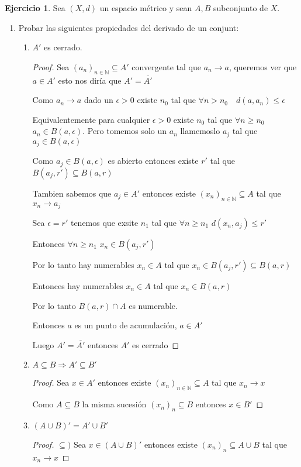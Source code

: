 \documentclass[12pt]{article}
\newcommand{\N}{\mathbb{N}}
\newcommand{\ra}{\rightarrow}
\newcommand{\ol}{\overline}
\theoremstyle{definition}
\newtheorem{ej}{Ejercicio}
\begin{document}
\begin{ej}
  Sea $(X,d)$ un espacio métrico y sean $A,B$ subconjunto de $X$.
  \begin{enumerate}
    \item Probar las siguientes propiedades del derivado de un conjunt:
      \begin{enumerate}
	\item $A'$ es cerrado.
	  \begin{proof}
	    Sea $(a_{n})_{n \in \N} \subseteq A'$ convergente tal que $a_{n} \ra a$, queremos ver que $a \in A'$ esto nos diría que $A' = \ol{A'}$

	    Como $a_{n} \ra a$ dado un $\epsilon > 0$ existe $n_{0}$ tal que $\forall n > n_{0} \quad d(a,a_{n}) \leq \epsilon$

	    Equivalentemente para cualquier $\epsilon > 0$ existe $n_{0}$ tal que $\forall n \geq n_{0}$ $a_{n} \in B(a,\epsilon)$. Pero tomemos solo un $a_{n}$ llamemoslo $a_{j}$ tal que $a_{j} \in B(a,\epsilon)$

	    Como $a_{j} \in B(a,\epsilon)$ es abierto entonces existe $r'$ tal que $B(a_{j},r') \subseteq B(a,r)$

	    Tambien sabemos que $a_{j} \in A'$ entonces existe $(x_{n})_{n \in \N} \subseteq A$ tal que $x_{n} \ra a_{j}$

	    Sea $\epsilon = r'$ tenemos que exsite  $n_{1}$ tal que $\forall n \geq n_{1}$ $d(x_{n}, a_{j}) \leq r'$

	    Entonces $\forall n \geq n_{1}$ $x_{n} \in B(a_{j},r')$

	    Por lo tanto hay numerables $x_{n} \in A$ tal que $x_{n}  \in B(a_{j},r') \subseteq B(a,r)$

	    Entonces hay numerables $x_{n} \in A$ tal que $x_{n} \in B(a,r)$

	    Por lo tanto $B(a,r) \cap A$ es numerable.

	    Entonces $a$ es un punto de acumulación, $a \in A'$

	    Luego $A' = \ol{A'}$ entonces $A'$ es cerrado
	  \end{proof}
	\item $A \subseteq B \Longrightarrow A' \subseteq B'$
	  \begin{proof}
	    Sea $x \in A'$ entonces existe $(x_{n} )_{n \in \N} \subseteq A$ tal que $x_{n} \ra x$

	    Como $A \subseteq B$ la misma sucesión $(x_{n})_{n} \subseteq B$ entonces $x \in B'$
	  \end{proof}
	\item $(A \cup B)' = A' \cup B'$
	  \begin{proof}
	  $\subseteq )$ Sea $x \in (A \cup B)'$ entonces existe $(x_{n})_{n} \subseteq A \cup B$ tal que $x_{n} \ra x$


\end{proof}
\end{enumerate}
\end{enumerate}
\end{ej}
\end{document}
